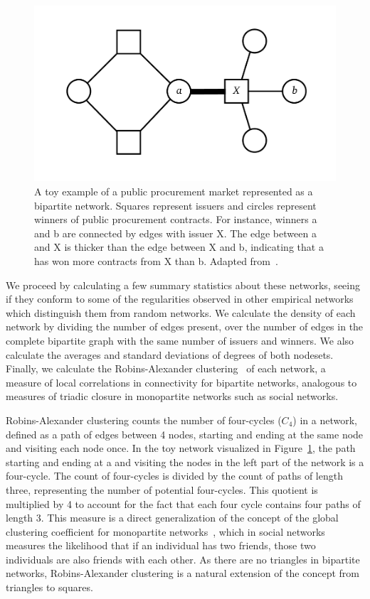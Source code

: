 \begin{figure}[t]
\centering
  \includegraphics[width=\textwidth]{images/ted_networks/toy_network.png}
  \caption[Toy bipartite network.]{A toy example of a public procurement market represented as a bipartite network. Squares represent issuers and circles represent winners of public procurement contracts. For instance, winners a and b are connected by edges with issuer X. The edge between a and X is thicker than the edge between X and b, indicating that a has won more contracts from X than b. Adapted from~\cite{fazekas2017corruption}.}
  \label{fig:toynetwork}
\end{figure}

We proceed by calculating a few summary statistics about these networks, seeing if they conform to some of the regularities observed in other empirical networks which distinguish them from random networks.  We calculate the density of each network by dividing the number of edges present, over the number of edges in the complete bipartite graph with the same number of issuers and winners. We also calculate the averages and standard deviations of degrees of both nodesets. Finally, we calculate the Robins-Alexander clustering~\cite{robins2004small} of each network, a measure of local correlations in connectivity for bipartite networks, analogous to measures of triadic closure in monopartite networks such as social networks. 

Robins-Alexander clustering counts the number of four-cycles ($C_{4}$) in a network, defined as a path of edges between 4 nodes, starting and ending at the same node and visiting each node once. In the toy network visualized in Figure~\ref{fig:toynetwork}, the path starting and ending at a and visiting the nodes in the left part of the network is a four-cycle. The count of four-cycles is divided by the count of paths of length three, representing the number of potential four-cycles. This quotient is multiplied by 4 to account for the fact that each four cycle contains four paths of length 3. This measure is a direct generalization of the concept of the global clustering coefficient for monopartite networks~\cite{wasserman1994social,watts1998collective}, which in social networks measures the likelihood that if an individual has two friends, those two individuals are also friends with each other. As there are no triangles in bipartite networks, Robins-Alexander clustering is a natural extension of the concept from triangles to squares. 


